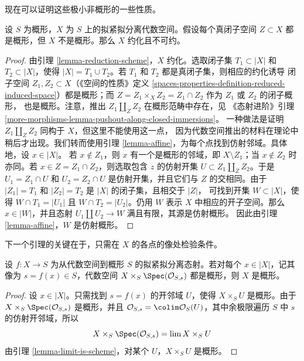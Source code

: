 \noindent
现在可以证明这些极小非概形的一些性质。

\begin{lemma}
\label{lemma-minimal-nonscheme}
设 $S$ 为概形，$X$ 为 $S$ 上的拟紧拟分离代数空间。假设每个真闭子空间
$Z \subset X$ 都是概形，但 $X$ 不是概形。那么 $X$ 约化且不可约。
\end{lemma}

\begin{proof}
由引理 \ref{lemma-reduction-scheme}，$X$ 约化。选取闭子集
$T_1 \subset |X|$ 和 $T_2 \subset |X|$，使得
$|X| = T_1 \cup T_2$。若 $T_1$ 和 $T_2$ 都是真闭子集，则相应的约化诱导
闭子空间 $Z_1, Z_2 \subset X$（《空间的性质》定义
\ref{spaces-properties-definition-reduced-induced-space}）都是概形；而
$Z = Z_1 \times_X Z_2 = Z_1 \cap Z_2$ 作为 $Z_1$ 或 $Z_2$ 的闭子概形，
也是概形。注意，推出 $Z_1 \amalg_Z Z_2$ 在概形范畴中存在，见
《态射进阶》引理
\ref{more-morphisms-lemma-pushout-along-closed-immersions}。
一种做法是证明 $Z_1 \amalg_Z Z_2$ 同构于 $X$，但这里不能使用这一点，
因为代数空间推出的材料在理论中稍后才出现。我们转而使用引理
\ref{lemma-affine}，为每个点找到仿射邻域。具体地，设 $x \in |X|$。
若 $x \not \in Z_1$，则 $x$ 有一个是概形的邻域，即
$X \setminus Z_1$；当 $x \not \in Z_2$ 时亦同。若
$x \in Z = Z_1 \cap Z_2$，则选取包含 $z$ 的仿射开集
$U \subset Z_1 \amalg_Z Z_2$。于是 $U_1 = Z_1 \cap U$ 和
$U_2 = Z_2 \cap U$ 是仿射开集，并且它们与 $Z$ 的交相同。由于
$|Z_1| = T_1$ 和 $|Z_2| = T_2$ 是 $|X|$ 的闭子集，且相交于 $|Z|$，
可找到开集 $W \subset |X|$，使得 $W \cap T_1 = |U_1|$ 且
$W \cap T_2 = |U_2|$。仍用 $W$ 表示 $X$ 中相应的开子空间。那么
$x \in |W|$，并且态射 $U_1 \amalg U_2 \to W$ 满且有限，其源是仿射概形。
因此由引理 \ref{lemma-affine}，$W$ 是仿射概形。
\end{proof}

\noindent
下一个引理的关键在于，只需在 $X$ 的各点的像处检验条件。

\begin{lemma}
\label{lemma-enough-local}
设 $f: X \to S$ 为从代数空间到概形 $S$ 的拟紧拟分离态射。若对每个
$x \in |X|$，记其像为 $s = f(x) \in S$，代数空间
$X \times_S \Spec(\mathcal{O}_{S,s})$ 都是概形，则 $X$ 是概形。
\end{lemma}

\begin{proof}
设 $x \in |X|$。只需找到 $s = f(x)$ 的开邻域 $U$，使得
$X \times_S U$ 是概形。由于 $X \times_S \Spec(\mathcal{O}_{S, s})$
是概形，并且
$\mathcal{O}_{S, s} = \colim \mathcal{O}_S(U)$，其中余极限遍历 $S$ 中
$s$ 的仿射开邻域，所以
$$
X \times_S \Spec(\mathcal{O}_{S, s}) = \lim X \times_S U
$$
由引理 \ref{lemma-limit-is-scheme}，对某个 $U$，$X \times_S U$ 是概形。
\end{proof}

